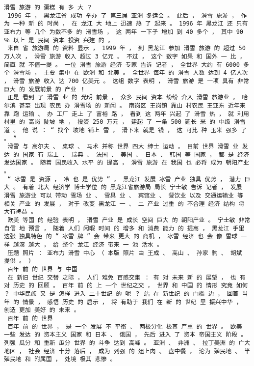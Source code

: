 \documentclass{article}
\begin{document}
\begin{Verbatim}[commandchars=\\\{\}]
 滑雪 旅游 的 蛋糕 有 多 大 ？ 
 1996 年 ， 黑龙江省 成功 举办 了 第三届 亚洲 冬运会 。 此后 ， 滑雪 旅游 ， 作为 一种 新 的 时尚 ， 在 龙江 大 地上 迅速 热 了 起来 。 1996 年 黑龙江 还 只有 亚布力 等 几个 为数不多 的 滑雪场 ， 这 两年 一下子 增加 到 40 多个 ， 其中 90 ％ 以上 是 民间 资本 投资 兴建 的 。 
 来自 省 旅游局 的 资料 显示 ， 1999 年 ， 到 黑龙江 参加 滑雪 旅游 的 超过 50 万人次 ， 滑雪 旅游 收入 超过 3 亿元 。 不过 ， 这个 数字 如果 和 国外 一 比 ， 简直 就 不值一提 。 一位 滑雪 旅游 经济 专家 告诉 记者 ， 全世界 大约 有 6000 多个 滑雪场 ， 主要 集中 在 欧洲 和 北美 。 全世界 每年 的 滑雪 人数 达到 4 亿人次 ， 滑雪 旅游 收入 达 700 亿美元 。 这组 数字 表明 ， 滑雪 旅游 是 一项 具有 非常 巨大 的 发展前景 的 产业 ！ 
 正是 看到 了 滑雪 业 的 光明 前景 ， 众多 民间 资本 纷纷 介入 滑雪 旅游业 。 哈尔滨 甚至 出现 农民 办 滑雪场 的 新闻 。 南岗区 王岗镇 靠山 村农民 王亚东 近年来 靠 跑 运输 、 办 工厂 走上 了 富裕 路 ， 看到 这 两年 兴起 了 滑雪 热 ， 就 利用 村里 的 高岗 陡坡 地 ， 投资 250 万元 ， 建起 了 一条 500 延长 米 的 中级 滑雪 道 。 他 说 ： “ 找个 坡地 铺上 雪 ， 滑下来 就是 钱 ， 这 可比 种 玉米 强多 了 。 ” 
 滑雪 与 高尔夫 、 桌球 、 马术 并称 世界 四大 绅士 运动 。 目前 世界 滑雪 业 发达 的 国家 有 瑞士 、 瑞典 、 法国 、 美国 、 日本 、 韩国 等 国家 ， 都 是 经济 发达国家 。 随着 国民收入 水平 的 提高 ， 滑雪 旅游 在 我国 也 必将 成为 朝阳产业 。 
 “ 冰雪 是 资源 ， 冷 也 是 优势 ” ， 黑龙江 发展 冰雪 产业 独具 优势 ， 潜力 巨大 。 有着 北大 经济学 博士学位 的 黑龙江省旅游局 局长 宁士敏 告诉 记者 ， 发展 滑雪 旅游业 可以 带动 雪场 业 、 雪具 业 、 宾馆业 、 餐饮业 以及 交通运输业 等 相关 产业 的 发展 ， 对于 改变 黑龙江 一 、 二 产业 过重 的 不合理 经济 结构 将 大有裨益 。 
 欧美 等国 的 经验 表明 ， 滑雪 产业 是 成长 空间 巨大 的 朝阳产业 。 宁士敏 非常 自信 地 预言 ， 随着 人们 闲暇 时间 的 增多 和 消费 能力 的 提高 ， 黑龙江 手里 这张 独具特色 的 “ 冰雪 牌 ” 会 带来 更大 的 商机 ， 冰雪 经济 也 会 像 雪球 一样 越滚 越大 ， 给 整个 龙江 经济 带来 一 池 活水 。 
 压题 照片 ： 亚布力 滑雪 中心 （ 本版 照片 由 王成 、 高山 、 孙家 驹 、 胡斌 提供 。 ） 
 百年 前 的 世界 与 中国 
 在 新旧 世纪 交替 之际 ， 人们 难免 百感交集 ： 有 对 未来 新 的 展望 ， 也 有 对 历史 的 回顾 。 百年 前 的 上 一个 世纪之交 ， 世界 和 中国 的 情形 究竟 如何 ？ 中华民族 又 是 怎样 进入 二十世纪 的 呢 ？ 站 在 新世纪 的 门槛 边 ， 回首 当年 的 情景 ， 感悟 历史 的 启示 ， 将 有助于 我们 在 新 的 世纪 里 振兴中华 ， 创造 更加 美好 的 未来 。 
 百年 前 的 世界 
 百年 前 的 世界 ， 是 一个 发展 不 平衡 、 两极分化 极其 严重 的 世界 。 欧美 一些 发达 的 资本主义 国家 和 日本 、 俄国 ， 先后 进入 了 资本 帝国主义 阶段 。 列强 瓜分 和 重新 瓜分 世界 的 斗争 达到 高峰 。 亚洲 、 非洲 、 拉丁美洲 的 广大 地区 ， 社会 经济 十分 落后 ， 成为 列强 的 俎上肉 、 盘中餐 ， 沦为 殖民地 、 半殖民地 和 附属国 ， 处境 极其 悲惨 。 

\end{Verbatim}
\end{document}
